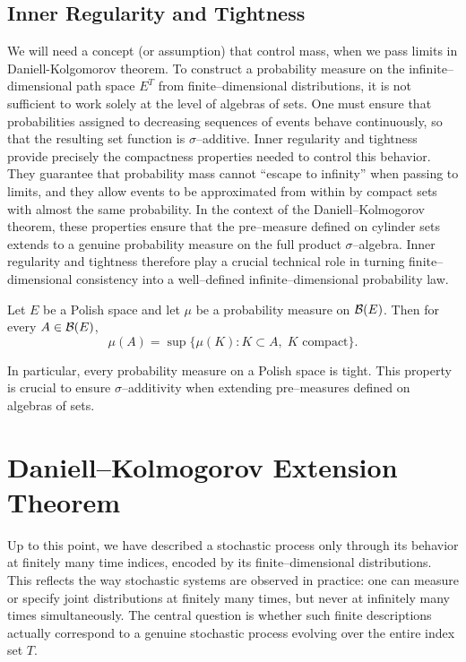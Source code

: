 \subsection{Inner Regularity and Tightness}
We will need a concept (or assumption) that control mass, when we pass limits in Daniell-Kolgomorov theorem. 
To construct a probability measure on the infinite--dimensional path space $E^T$ from
finite--dimensional distributions, it is not sufficient to work solely at the level of
algebras of sets. One must ensure that probabilities assigned to decreasing sequences of
events behave continuously, so that the resulting set function is $\sigma$--additive.
Inner regularity and tightness provide precisely the compactness properties needed to
control this behavior. They guarantee that probability mass cannot ``escape to infinity''
when passing to limits, and they allow events to be approximated from within by compact
sets with almost the same probability. In the context of the Daniell--Kolmogorov theorem,
these properties ensure that the pre--measure defined on cylinder sets extends to a
genuine probability measure on the full product $\sigma$--algebra. Inner regularity and
tightness therefore play a crucial technical role in turning finite--dimensional
consistency into a well--defined infinite--dimensional probability law.
\begin{lemma}
Let $E$ be a Polish space and let $\mu$ be a probability measure on $\mathcal{B}(E)$.
Then for every $A \in \mathcal{B}(E)$,
\[
\mu(A)
=
\sup\{\mu(K) : K \subset A,\; K \text{ compact}\}.
\]
\end{lemma}

\begin{remark}
In particular, every probability measure on a Polish space is tight.
This property is crucial to ensure $\sigma$--additivity when extending
pre--measures defined on algebras of sets.
\end{remark}

\section{Daniell--Kolmogorov Extension Theorem}

Up to this point, we have described a stochastic process only through its behavior at
finitely many time indices, encoded by its finite--dimensional distributions. This reflects
the way stochastic systems are observed in practice: one can measure or specify joint
distributions at finitely many times, but never at infinitely many times simultaneously.
The central question is whether such finite descriptions actually correspond to a genuine
stochastic process evolving over the entire index set $T$.

